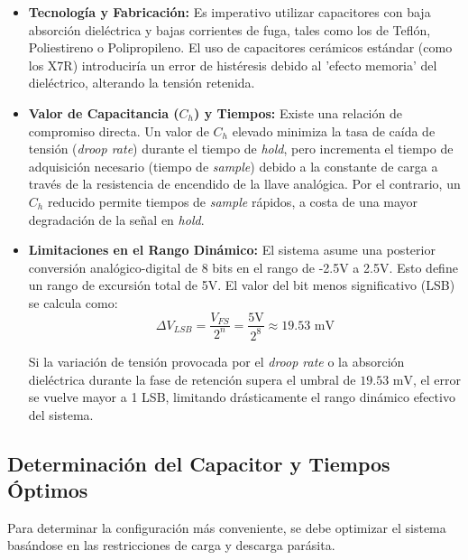 \begin{itemize}
	\item \textbf{Tecnología y Fabricación:} Es imperativo utilizar capacitores con baja absorción dieléctrica y bajas corrientes de fuga, tales como los de Teflón, Poliestireno o Polipropileno. El uso de capacitores cerámicos estándar (como los X7R) introduciría un error de histéresis debido al 'efecto memoria' del dieléctrico, alterando la tensión retenida.
	\newpage
	\item \textbf{Valor de Capacitancia ($C_h$) y Tiempos:} Existe una relación de compromiso directa. Un valor de $C_h$ elevado minimiza la tasa de caída de tensión (\textit{droop rate}) durante el tiempo de \textit{hold}, pero incrementa el tiempo de adquisición necesario (tiempo de \textit{sample}) debido a la constante de carga a través de la resistencia de encendido de la llave analógica. Por el contrario, un $C_h$ reducido permite tiempos de \textit{sample} rápidos, a costa de una mayor degradación de la señal en \textit{hold}.
	
	\item \textbf{Limitaciones en el Rango Dinámico:} El sistema asume una posterior conversión analógico-digital de 8 bits en el rango de -2.5V a 2.5V. Esto define un rango de excursión total de 5V. El valor del bit menos significativo (LSB) se calcula como:
	\begin{equation}
		\Delta V_{LSB} = \frac{V_{FS}}{2^n} = \frac{5\text{V}}{2^8} \approx 19.53\text{ mV}
	\end{equation}
	
	Si la variación de tensión provocada por el \textit{droop rate} o la absorción dieléctrica durante la fase de retención supera el umbral de $19.53\text{ mV}$, el error se vuelve mayor a 1 LSB, limitando drásticamente el rango dinámico efectivo del sistema.
\end{itemize}

\subsection{Determinación del Capacitor y Tiempos Óptimos}

Para determinar la configuración más conveniente, se debe optimizar el sistema basándose en las restricciones de carga y descarga parásita.


